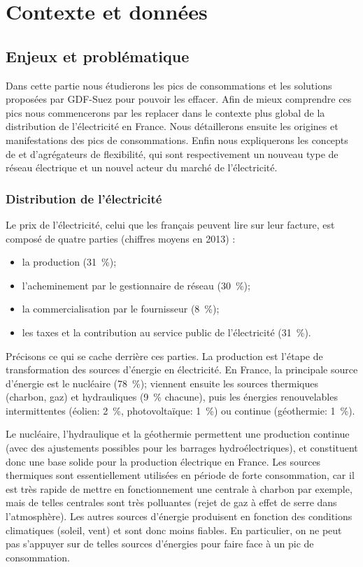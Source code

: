 \section{Contexte et données}

\subsection{Enjeux et problématique}

Dans cette partie nous étudierons les pics de consommations et les solutions proposées par GDF-Suez pour pouvoir les effacer. Afin de mieux comprendre ces pics nous commencerons par les replacer dans le contexte plus global de la distribution de l'électricité en France. Nous détaillerons ensuite les origines et manifestations des pics de consommations. Enfin nous expliquerons les concepts de \smartgrid{} et d'agrégateurs de flexibilité, qui sont respectivement un nouveau type de réseau électrique et un nouvel acteur du marché de l'électricité.


\subsubsection{Distribution de l'électricité}

Le prix de l'électricité, celui que les français peuvent lire sur leur facture, est composé de quatre parties (chiffres moyens en 2013) :
\begin{itemize}
	\item la production (\SI{31}{\percent});
	\item l'acheminement par le gestionnaire de réseau (\SI{30}{\percent});
	\item la commercialisation par le fournisseur (\SI{8}{\percent});
	\item les taxes et la contribution au service public de l'électricité (\SI{31}{\percent}).
\end{itemize}

\bigskip

Précisons ce qui se cache derrière ces parties.
La production est l'étape de transformation des sources d'énergie en électricité.
En France, la principale source d'énergie est le nucléaire (\SI{78}{\percent}); viennent ensuite les sources thermiques (charbon, gaz) et hydrauliques (\SI{9}{\percent} chacune), puis les énergies renouvelables intermittentes (éolien: \SI{2}{\percent}, photovoltaïque: \SI{1}{\percent}) ou continue (géothermie: \SI{1}{\percent}).

Le nucléaire, l'hydraulique et la géothermie permettent une production continue (avec des ajustements possibles pour les barrages hydroélectriques), et constituent donc une base solide pour la production électrique en France. Les sources thermiques sont essentiellement utilisées en période de forte consommation, car il est très rapide de mettre en fonctionnement une centrale à charbon par exemple, mais de telles centrales sont très polluantes (rejet de gaz à effet de serre dans l'atmosphère). Les autres sources d'énergie produisent en fonction des conditions climatiques (soleil, vent) et sont donc moins fiables. En particulier, on ne peut pas s'appuyer sur de telles sources d'énergies pour faire face à un pic de consommation.


